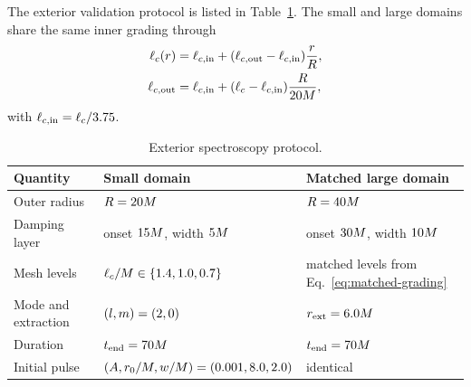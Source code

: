 \documentclass[
  aps,
  prd,
  reprint,
  superscriptaddress,
  nofootinbib,
  longbibliography
]{revtex4-2}
\begin{document}
The exterior validation protocol is listed in
Table~\ref{tab:exterior-protocol}.  The small and large domains share the
same inner grading through
\begin{align}
  \ell_c(r)
  &=\ell_{c,\rm in}
    +(\ell_{c,\rm out}-\ell_{c,\rm in})\frac{r}{R}, \\
  \ell_{c,\rm out}
  &=\ell_{c,\rm in}
    +(\ell_c-\ell_{c,\rm in})\frac{R}{20 M},
  \label{eq:matched-grading}
\end{align}
with $\ell_{c,\rm in}=\ell_c/3.75$.

\begin{table}
  \caption{Exterior spectroscopy protocol.}
  \label{tab:exterior-protocol}
  \begin{tabular}{lll}
    \toprule
    Quantity & Small domain & Matched large domain \\
    \midrule
    Outer radius & $R=20 M$
      & $R=40 M$ \\
    Damping layer & onset $15 M$, width
      $5 M$
      & onset $30 M$, width
        $10 M$ \\
    Mesh levels & $\ell_c/M\in\{1.4,
      1.0,0.7\}$
      & matched levels from Eq.~\eqref{eq:matched-grading} \\
    Mode and extraction & $(l,m)=(2,0)$
      & $r_{\rm ext}=6.0 M$ \\
    Duration & $t_{\rm end}=70 M$
      & $t_{\rm end}=70 M$ \\
    Initial pulse & $(A,r_0/M,w/M)=(0.001,
      8.0,2.0)$
      & identical \\

\end{tabular}
\end{table}
\end{document}
